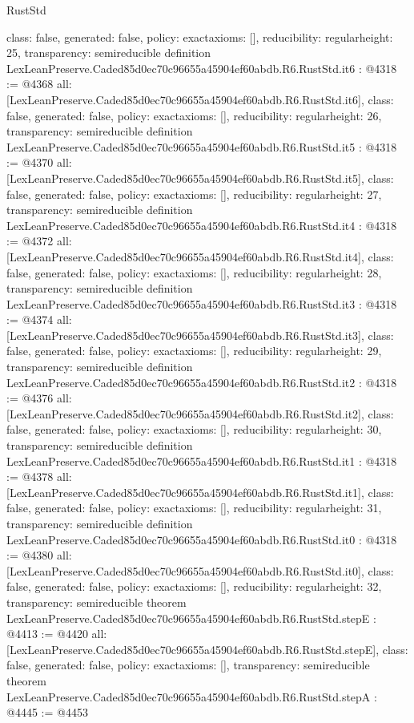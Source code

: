 \begin{lexlean}{RustStd}
\begin{coremodule}
{  class: false,
  generated: false,
  policy: exact{axioms: []},
  reducibility: regular{height: 25},
  transparency: semireducible
}
definition LexLeanPreserve.Caded85d0ec70c96655a45904ef60abdb.R6.RustStd.it6 : @4318 := @4368 {
  all: [LexLeanPreserve.Caded85d0ec70c96655a45904ef60abdb.R6.RustStd.it6],
  class: false,
  generated: false,
  policy: exact{axioms: []},
  reducibility: regular{height: 26},
  transparency: semireducible
}
definition LexLeanPreserve.Caded85d0ec70c96655a45904ef60abdb.R6.RustStd.it5 : @4318 := @4370 {
  all: [LexLeanPreserve.Caded85d0ec70c96655a45904ef60abdb.R6.RustStd.it5],
  class: false,
  generated: false,
  policy: exact{axioms: []},
  reducibility: regular{height: 27},
  transparency: semireducible
}
definition LexLeanPreserve.Caded85d0ec70c96655a45904ef60abdb.R6.RustStd.it4 : @4318 := @4372 {
  all: [LexLeanPreserve.Caded85d0ec70c96655a45904ef60abdb.R6.RustStd.it4],
  class: false,
  generated: false,
  policy: exact{axioms: []},
  reducibility: regular{height: 28},
  transparency: semireducible
}
definition LexLeanPreserve.Caded85d0ec70c96655a45904ef60abdb.R6.RustStd.it3 : @4318 := @4374 {
  all: [LexLeanPreserve.Caded85d0ec70c96655a45904ef60abdb.R6.RustStd.it3],
  class: false,
  generated: false,
  policy: exact{axioms: []},
  reducibility: regular{height: 29},
  transparency: semireducible
}
definition LexLeanPreserve.Caded85d0ec70c96655a45904ef60abdb.R6.RustStd.it2 : @4318 := @4376 {
  all: [LexLeanPreserve.Caded85d0ec70c96655a45904ef60abdb.R6.RustStd.it2],
  class: false,
  generated: false,
  policy: exact{axioms: []},
  reducibility: regular{height: 30},
  transparency: semireducible
}
definition LexLeanPreserve.Caded85d0ec70c96655a45904ef60abdb.R6.RustStd.it1 : @4318 := @4378 {
  all: [LexLeanPreserve.Caded85d0ec70c96655a45904ef60abdb.R6.RustStd.it1],
  class: false,
  generated: false,
  policy: exact{axioms: []},
  reducibility: regular{height: 31},
  transparency: semireducible
}
definition LexLeanPreserve.Caded85d0ec70c96655a45904ef60abdb.R6.RustStd.it0 : @4318 := @4380 {
  all: [LexLeanPreserve.Caded85d0ec70c96655a45904ef60abdb.R6.RustStd.it0],
  class: false,
  generated: false,
  policy: exact{axioms: []},
  reducibility: regular{height: 32},
  transparency: semireducible
}
theorem LexLeanPreserve.Caded85d0ec70c96655a45904ef60abdb.R6.RustStd.stepE : @4413 := @4420 {
  all: [LexLeanPreserve.Caded85d0ec70c96655a45904ef60abdb.R6.RustStd.stepE],
  class: false,
  generated: false,
  policy: exact{axioms: []},
  transparency: semireducible
}
theorem LexLeanPreserve.Caded85d0ec70c96655a45904ef60abdb.R6.RustStd.stepA : @4445 := @4453 {
}
\end{coremodule}
\end{lexlean}
